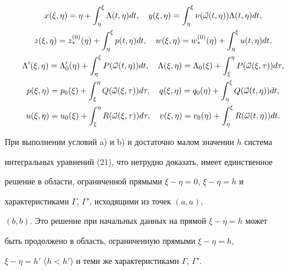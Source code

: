 \begin{gather} 


x(\xi,\eta)=\eta+\int^\xi_\eta \Lambda(t,\eta)dt,\quad 


y(\xi,\eta)=\int^\xi_\eta \nu(\Vec\omega(t,\eta)) 


\Lambda(t,\eta)dt,\notag \\ 


% 


z(\xi,\eta)=z^{(0)}_*(\eta)+\int^\xi_\eta p(t,\eta)dt,\quad 


w(\xi,\eta)=w^{(0)}_*(\eta)+\int^\xi_\eta u(t,\eta)dt,\notag \\ 


%


\Lambda'(\xi,\eta)=\Lambda'_0(\eta)+\int^\xi_\eta 


P(\Vec\omega(t,\eta))dt,\quad 


\Lambda(\xi,\eta)=\Lambda_0(\xi)+\int^\eta_\xi 


P(\Vec\omega(\xi,\tau))d\tau, \\ 


% 


p(\xi,\eta)=p_0(\xi)+\int^\eta_\xi Q(\Vec\omega(\xi,\tau))d\tau,\quad 


q(\xi,\eta)=q_0(\eta)+\int^\xi_\eta Q(\Vec\omega(t,\eta))dt,\notag \\ 


% 


u(\xi,\eta)=u_0(\xi)+\int^\eta_\xi R(\Vec\omega(\xi,\tau))d\tau,\quad 


v(\xi,\eta)=v_0(\eta)+\int^\xi_\eta R(\Vec\omega(t,\eta))dt\notag. 


\end{gather} 


 


При выполнении условий a) и b) и достаточно малом значении $h$ система 


интегральных уравнений (21), что нетрудно доказать, имеет единственное 


решение в области, ограниченной прямыми $\xi-\eta=0$, $\xi-\eta=h$ и 


характеристиками $\Gamma$, $\Gamma'$, исходящими из точек $(a,a)$, 


$(b,b)$. Это решение при начальных данных на прямой $\xi-\eta=h$ может 


быть продолжено в область, ограниченную прямыми $\xi-\eta=h$, 


$\xi-\eta=h'$ ($h<h'$) и теми же характеристиками $\Gamma$, $\Gamma'$. 


